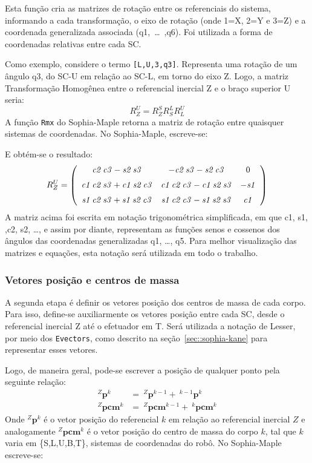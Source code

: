 Esta função cria as matrizes de rotação entre os referenciais do sistema,
informando a cada transformação, o eixo de rotação
(onde 1=X, 2=Y e 3=Z) e a coordenada generalizada associada
(q1,~\ldots~,q6). Foi utilizada a forma de coordenadas relativas entre cada SC.

Como exemplo, considere o termo {\tt [L,U,3,q3]}. Representa uma rotação de um
ângulo q3, do SC-U em relação ao SC-L, em torno do eixo Z.
Logo, a matriz Transformação Homogênea entre o referencial inercial Z e o braço
superior U seria:
%
$$ R_{Z}^{U} = R_{Z}^{S} R_{S}^{L} R_{L}^{U} $$
%
A função \texttt{Rmx} do Sophia-Maple retorna a matriz de rotação entre quaisquer
sistemas de coordenadas. No Sophia-Maple, escreve-se:

\medskip {} \medskip 

E obtém-se o resultado:
%
$$ R_{Z}^{U} = \left( \begin {array}{ccc} {\it c2}\,{\it c3}-{\it s2}\,{\it
s3}&-{ \it c2}\,{\it s3}-{\it s2}\,{\it c3}&0\\ \noalign{\medskip}{\it c1}\,{
\it c2}\,{\it s3}+{\it c1}\,{\it s2}\,{\it c3}&{\it c1}\,{\it c2}\,{
\it c3}-{\it c1}\,{\it s2}\,{\it s3}&-{\it s1}\\ \noalign{\medskip}{
\it s1}\,{\it c2}\,{\it s3}+{\it s1}\,{\it s2}\,{\it c3}&{\it s1}\,{
\it c2}\,{\it c3}-{\it s1}\,{\it s2}\,{\it s3}&{\it c1}\end {array}
 \right) $$
 A matriz acima foi escrita em notação trigonométrica simplificada, em que c1,
 s1, ,c2, s2, \ldots, e assim por diante, representam as funções senos e
 cossenos dos ângulos das coordenadas generalizadas q1, \ldots, q5. Para melhor
 visualização das matrizes e equações, esta notação será utilizada em todo o
 trabalho.
 
\subsubsection{Vetores posição e centros de massa}

A segunda etapa é definir os vetores posição dos centros de massa de cada corpo.
Para isso, define-se auxiliarmente os vetores posição entre cada SC, desde o
referencial inercial Z até o efetuador em T. Será utilizada a notação de Lesser,
por meio dos \texttt{Evectors}, como descrito na seção~\ref{sec::sophia-kane}
para representar esses vetores.

Logo, de maneira geral, pode-se escrever a posição de qualquer ponto pela
seguinte relação:
%
\begin{align}
	^{Z}\mathbf{p}^{k} &= ~^{Z}\mathbf{p}^{k-1} + ~^{k-1}\mathbf{p}^{k} \\
	^{Z}\mathbf{pcm}^{k} &= ~^{Z}\mathbf{pcm}^{k-1} + ~^{k}\mathbf{pcm}^k
	\label{eq::pcm}
\end{align}
%
Onde $^{Z}\mathbf{p}^{k}$ é o vetor posição do referencial $k$ em relação ao
referencial inercial $Z$ e analogamente $^{Z}\mathbf{pcm}^{k}$ é o vetor
posição do centro de massa do corpo $k$, tal que $k$ varia em \{S,L,U,B,T\},
sistemas de coordenadas do robô.
No Sophia-Maple escreve-se:

